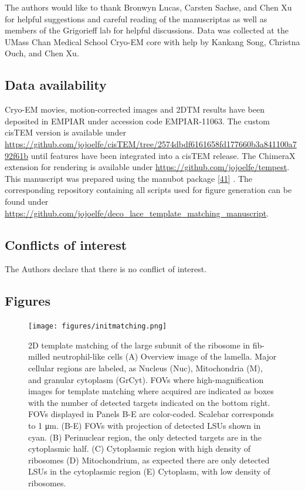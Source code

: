 \documentclass[
]{article}
\begin{document}
The authors would like to thank Bronwyn Lucas, Carsten Sachse, and Chen
Xu for helpful suggestions and careful reading of the manuscriptas as
well as members of the Grigorieff lab for helpful discussions. Data was
collected at the UMass Chan Medical School Cryo-EM core with help by
Kankang Song, Christna Ouch, and Chen Xu.

\hypertarget{data-availability}{%
\subsection{Data availability}\label{data-availability}}

Cryo-EM movies, motion-corrected images and 2DTM results have been
deposited in EMPIAR under accession code EMPIAR-11063. The custom cisTEM
version is available under
\url{https://github.com/jojoelfe/cisTEM/tree/2574dbdf6161658fd177660b3a841100a792f61b}
until features have been integrated into a cisTEM release. The ChimeraX
extension for rendering is available under
\url{https://github.com/jojoelfe/tempest}. This manuscript was prepared
using the manubot package {[}\protect\hyperlink{ref-YuJbg3zO}{41}{]} . The
corresponding repository containing all scripts used for figure
generation can be found under
\url{https://github.com/jojoelfe/deco_lace_template_matching_manuscript}.

\hypertarget{conflicts-of-interest}{%
\subsection{Conflicts of interest}\label{conflicts-of-interest}}

The Authors declare that there is no conflict of interest.

\hypertarget{figures}{%
\subsection{Figures}\label{figures}}

\begin{figure}
\hypertarget{fig:initmatching}{%
\centering
\texttt{[image: figures/initmatching.png]}
\caption{2D template matching of the large subunit of the ribosome in
fib-milled neutrophil-like cells (A) Overview image of the lamella.
Major cellular regions are labeled, as Nucleus (Nuc), Mitochondria (M),
and granular cytoplasm (GrCyt). FOVs where high-magnification images for
template matching where acquired are indicated as boxes with the number
of detected targets indicated on the bottom right. FOVs displayed in
Panels B-E are color-coded. Scalebar corresponds to 1 μm. (B-E) FOVs
with projection of detected LSUs shown in cyan. (B) Perinuclear region,
the only detected targets are in the cytoplasmic half. (C) Cytoplasmic
region with high density of ribosomes (D) Mitochondrium, as expected
there are only detected LSUs in the cytoplasmic region (E) Cytoplasm,
with low density of
ribosomes.}\label{fig:initmatching}
}
\end{figure}
\end{document}
